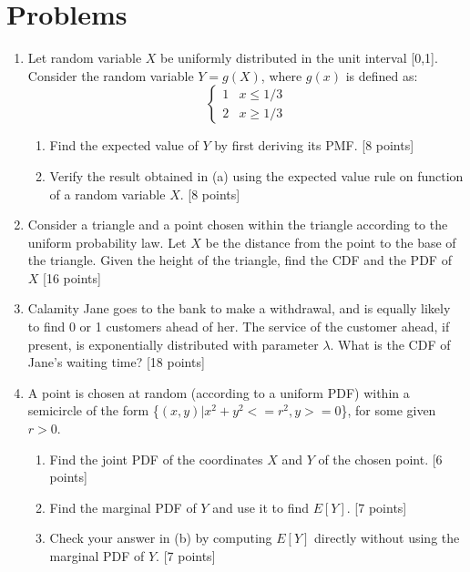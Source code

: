 \documentclass[12pt, oneside]{article}
\begin{document}
\section{Problems}
\begin{enumerate}

\item Let random variable $X$ be uniformly distributed in the unit interval [0,1]. Consider the random variable $Y = g(X)$, where $g(x)$ is defined as:
\[ \begin{cases} 
      1 & x\leq 1/3 \\
      2 & x\geq 1/3 
   \end{cases}
\]
\begin{enumerate}
    \item Find the expected value of $Y$ by first deriving its PMF. [8 points]
    \item Verify the result obtained in (a) using the expected value rule on function of a random variable $X$. [8 points]
\end{enumerate}

\newpage
\item Consider a triangle and a point chosen within the triangle according to the uniform probability law. Let $X$ be the distance from the point to the base of the triangle. Given the height of the triangle, find the CDF and the PDF of $X$  [16 points]

\newpage
\item Calamity Jane goes to the bank to make a withdrawal, and is equally likely to find 0 or 1 customers ahead of her. The service of the customer ahead, if present, is exponentially distributed with parameter $\lambda$. What is the CDF of Jane's waiting time? [18 points]

\newpage
\item A point is chosen at random (according to a uniform PDF) within a semicircle of the form \{${(x,y)| x^2+y^2 <= r^2, y >= 0 }$\}, for some given $r > 0$.
\begin{enumerate}
    \item Find the joint PDF of the coordinates $X$ and $Y$ of the chosen point.  [6 points]
    \item Find the marginal PDF of $Y$ and use it to find $E[Y]$.  [7 points]
    \item Check your answer in (b) by computing $E[Y]$ directly without using the marginal PDF of $Y$.  [7 points]
\end{enumerate}


\end{enumerate}
\end{document}
